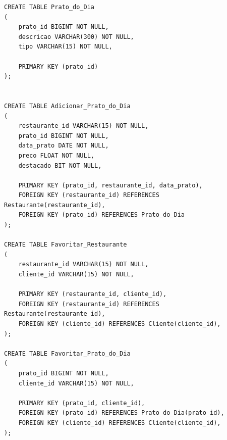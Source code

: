 \documentclass[a4paper,12pt]{report}
\begin{document}
\begin{lstlisting}
CREATE TABLE Prato_do_Dia
(
	prato_id BIGINT NOT NULL,
	descricao VARCHAR(300) NOT NULL,
	tipo VARCHAR(15) NOT NULL,

	PRIMARY KEY (prato_id)
);


CREATE TABLE Adicionar_Prato_do_Dia
(
	restaurante_id VARCHAR(15) NOT NULL,
	prato_id BIGINT NOT NULL,
	data_prato DATE NOT NULL,
	preco FLOAT NOT NULL,
	destacado BIT NOT NULL,

	PRIMARY KEY (prato_id, restaurante_id, data_prato),
	FOREIGN KEY (restaurante_id) REFERENCES Restaurante(restaurante_id),
	FOREIGN KEY (prato_id) REFERENCES Prato_do_Dia
);

CREATE TABLE Favoritar_Restaurante
(
	restaurante_id VARCHAR(15) NOT NULL,
	cliente_id VARCHAR(15) NOT NULL,

	PRIMARY KEY (restaurante_id, cliente_id),
	FOREIGN KEY (restaurante_id) REFERENCES Restaurante(restaurante_id),
	FOREIGN KEY (cliente_id) REFERENCES Cliente(cliente_id),
);

CREATE TABLE Favoritar_Prato_do_Dia
(
	prato_id BIGINT NOT NULL,
	cliente_id VARCHAR(15) NOT NULL,

	PRIMARY KEY (prato_id, cliente_id),
	FOREIGN KEY (prato_id) REFERENCES Prato_do_Dia(prato_id),
	FOREIGN KEY (cliente_id) REFERENCES Cliente(cliente_id),
);

\end{lstlisting}

	
\end{document}
